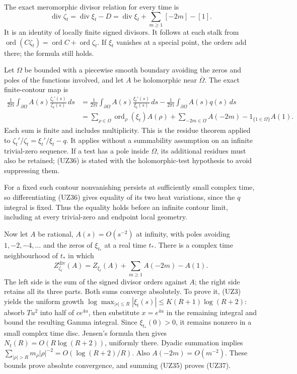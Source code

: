 \documentclass[
  10pt,
  a4paper,
]{article}
\begin{document}
The exact meromorphic divisor relation for every time is \[
\operatorname{div}\zeta_t=\operatorname{div}\xi_t-D
=\operatorname{div}\xi_t+\sum_{m\ge1}[-2m]-[1].
\tag{UZ35}
\] It is an identity of locally finite signed divisors. It follows at
each stalk from
\(\operatorname{ord}(C\zeta_t)=\operatorname{ord}C+\operatorname{ord}\zeta_t\).
If \(\xi_t\) vanishes at a special point, the orders add there; the
formula still holds.

Let \(\Omega\) be bounded with a piecewise smooth boundary avoiding the
zeros and poles of the functions involved, and let \(A\) be holomorphic
near \(\overline\Omega\). The exact finite-contour map is \[
\begin{aligned}
\frac1{2\pi i}\int_{\partial\Omega}
 A(s)\frac{\zeta_t'(s)}{\zeta_t(s)}\,ds
&=\frac1{2\pi i}\int_{\partial\Omega}
 A(s)\frac{\xi_t'(s)}{\xi_t(s)}\,ds
-\frac1{2\pi i}\int_{\partial\Omega}A(s)q(s)\,ds\\
&=\sum_{\rho\in\Omega}\operatorname{ord}_\rho(\xi_t)A(\rho)
+\sum_{-2m\in\Omega}A(-2m)-1_{\{1\in\Omega\}}A(1).
\end{aligned}\tag{UZ36}
\] Each sum is finite and includes multiplicity. This is the residue
theorem applied to \(\zeta_t'/\zeta_t=\xi_t'/\xi_t-q\). It applies
without a summability assumption on an infinite trivial-zero sequence.
If a test has a pole inside \(\Omega\), its additional residues must
also be retained; (UZ36) is stated with the holomorphic-test hypothesis
to avoid suppressing them.

For a fixed such contour nonvanishing persists at sufficiently small
complex time, so differentiating (UZ36) gives equality of its two heat
variations, since the \(q\) integral is fixed. Thus the equality holds
before an infinite contour limit, including at every trivial-zero and
endpoint local geometry.

Now let \(A\) be rational, \(A(s)=O(s^{-2})\) at infinity, with poles
avoiding \(1,-2,-4,\ldots\) and the zeros of \(\xi_{t_*}\) at a real
time \(t_*\). There is a complex time neighbourhood of \(t_*\) in which
\[
\boxed{\quad
Z_{\zeta_t}^{\mathrm{div}}(A)
=Z_{\xi_t}(A)+\sum_{m\ge1}A(-2m)-A(1).
\quad}\tag{UZ37}
\] The left side is the sum of the signed divisor orders against \(A\);
the right side retains all its three parts. Both sums converge
absolutely. To prove it, (UZ3) yields the uniform growth
\(\log\max_{|s|\le R}|\xi_t(s)|\le K(R+1)\log(R+2)\): absorb \(Tu^2\)
into half of \(ce^{4u}\), then substitute \(x=e^{4u}\) in the remaining
integral and bound the resulting Gamma integral. Since
\(\xi_{t_*}(0)>0\), it remains nonzero in a small complex time disc.
Jensen's formula then gives \(N_t(R)=O(R\log(R+2))\), uniformly there.
Dyadic summation implies
\(\sum_{|\rho|>R}m_\rho|\rho|^{-2}=O(\log(R+2)/R)\). Also
\(A(-2m)=O(m^{-2})\). These bounds prove absolute convergence, and
summing (UZ35) proves (UZ37).
\end{document}
